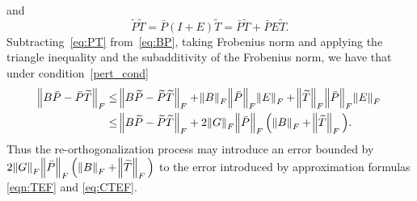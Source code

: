 \documentclass[11pt]{article}
\begin{document}
and
\begin{equation} \label{eq:PT}
\widetilde{P}\widetilde{T} = \bar{P}(I + E)\widetilde{T} = \bar{P}\widetilde{T} + \bar{P}E\widetilde{T}.
\end{equation}
Subtracting~\eqref{eq:PT} from~\eqref{eq:BP}, taking Frobenius norm and applying the triangle inequality and the subadditivity of the Frobenius norm,  we have that under condition~\eqref{pert_cond}
\begin{equation}
\begin{split}
\norm{B\bar{P} - \bar{P}\widetilde{T}}_F & \leq \norm{B\widetilde{P} - \widetilde{P}\widetilde{T}}_F + \norm{B}_F \norm{\bar{P}}_F\norm{E}_F + \norm{\widetilde{T}}_F \norm{\bar{P}}_F\norm{E}_F \\
                      & \leq \norm{B\widetilde{P} - \widetilde{P}\widetilde{T}}_F + 2 \norm{G} _F \norm{\bar{P}}_F \Big( \norm{B}_F + \norm{\widetilde{T}}_F \Big) .
\end{split}
\end{equation}
Thus the re-orthogonalization process may introduce an error bounded by $2 \norm{G}_F  \norm{\bar{P}}_F \Big( \norm{B}_F + \norm{\widetilde{T}}_F \Big)$ to the error introduced by approximation formulas \eqref{eqn:TEF} and \eqref{eq:CTEF}.
\end{document}
